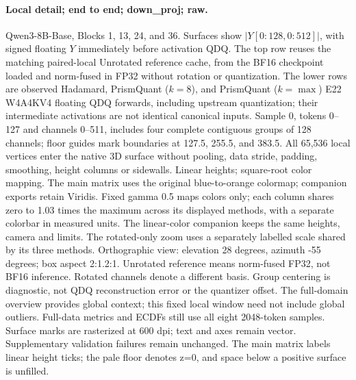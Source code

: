 \paragraph{Local detail; end to end; down\_proj; raw.} Qwen3-8B-Base, Blocks 1, 13, 24, and 36. Surfaces show $|Y[0:128,0:512]|$, with signed floating $Y$ immediately before activation QDQ. The top row reuses the matching paired-local Unrotated reference cache, from the BF16 checkpoint loaded and norm-fused in FP32 without rotation or quantization. The lower rows are observed Hadamard, PrismQuant ($k=8$), and PrismQuant ($k=\max$) E22 W4A4KV4 floating QDQ forwards, including upstream quantization; their intermediate activations are not identical canonical inputs. Sample 0, tokens 0--127 and channels 0--511, includes four complete contiguous groups of 128 channels; floor guides mark boundaries at 127.5, 255.5, and 383.5. All 65,536 local vertices enter the native 3D surface without pooling, data stride, padding, smoothing, height columns or sidewalls. Linear heights; square-root color mapping. The main matrix uses the original blue-to-orange colormap; companion exports retain Viridis. Fixed gamma 0.5 maps colors only; each column shares zero to 1.03 times the maximum across its displayed methods, with a separate colorbar in measured units. The linear-color companion keeps the same heights, camera and limits. The rotated-only zoom uses a separately labelled scale shared by its three methods. Orthographic view: elevation 28 degrees, azimuth -55 degrees; box aspect 2:1.2:1. Unrotated reference means norm-fused FP32, not BF16 inference. Rotated channels denote a different basis. Group centering is diagnostic, not QDQ reconstruction error or the quantizer offset. The full-domain overview provides global context; this fixed local window need not include global outliers. Full-data metrics and ECDFs still use all eight 2048-token samples. Surface marks are rasterized at 600 dpi; text and axes remain vector. Supplementary validation failures remain unchanged. The main matrix labels linear height ticks; the pale floor denotes z=0, and space below a positive surface is unfilled.

